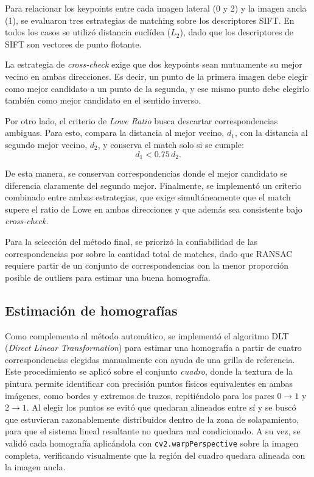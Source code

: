 \documentclass[a4paper,11pt]{article}
\begin{document}
Para relacionar los keypoints entre cada imagen lateral (0 y 2) y la imagen ancla (1), se evaluaron tres estrategias de matching sobre los descriptores SIFT. En todos los casos se utilizó distancia euclídea ($L_2$), dado que los descriptores de SIFT son vectores de punto flotante.

La estrategia de \textit{cross-check} exige que dos keypoints sean mutuamente su mejor vecino en ambas direcciones. Es decir, un punto de la primera imagen debe elegir como mejor candidato a un punto de la segunda, y ese mismo punto debe elegirlo también como mejor candidato en el sentido inverso.

Por otro lado, el criterio de \textit{Lowe Ratio} busca descartar correspondencias ambiguas. Para esto, compara la distancia al mejor vecino, $d_1$, con la distancia al segundo mejor vecino, $d_2$, y conserva el match solo si se cumple:
\[
d_1 < 0.75\, d_2.
\]

De esta manera, se conservan correspondencias donde el mejor candidato se diferencia claramente del segundo mejor. Finalmente, se implementó un criterio combinado entre ambas estrategias, que exige simultáneamente que el match supere el ratio de Lowe en ambas direcciones y que además sea consistente bajo \textit{cross-check}.

Para la selección del método final, se priorizó la confiabilidad de las correspondencias por sobre la cantidad total de matches, dado que RANSAC requiere partir de un conjunto de correspondencias con la menor proporción posible de outliers para estimar una buena homografía.

\subsection*{Estimación de homografías}

Como complemento al método automático, se implementó el algoritmo DLT (\textit{Direct Linear Transformation}) para estimar una homografía a partir de cuatro correspondencias elegidas manualmente con ayuda de una grilla de referencia. Este procedimiento se aplicó sobre el conjunto \textit{cuadro}, donde la textura de la pintura permite identificar con precisión puntos físicos equivalentes en ambas imágenes, como bordes y extremos de trazos, repitiéndolo para los pares $0\to1$ y $2\to1$. Al elegir los puntos se evitó que quedaran alineados entre sí y se buscó que estuvieran razonablemente distribuidos dentro de la zona de solapamiento, para que el sistema lineal resultante no quedara mal condicionado. A su vez, se validó cada homografía aplicándola con \texttt{cv2.warpPerspective} sobre la imagen completa, verificando visualmente que la región del cuadro quedara alineada con la imagen ancla.
\end{document}
